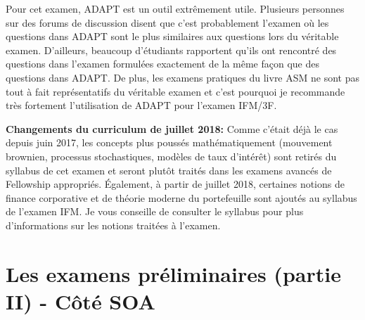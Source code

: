 Pour cet examen, ADAPT est un outil extrêmement utile. Plusieurs personnes sur des forums de discussion disent que c'est probablement l'examen où les questions dans ADAPT sont le plus similaires aux questions lors du véritable examen. D'ailleurs, beaucoup d'étudiants rapportent qu'ils ont rencontré des questions dans l'examen formulées exactement de la même façon que des questions dans ADAPT. De plus, les examens pratiques du livre ASM ne sont pas tout à fait représentatifs du véritable examen et c'est pourquoi je recommande très fortement l'utilisation de ADAPT pour l'examen IFM/3F.\vspace{\baselineskip}

\textbf{Changements du curriculum de juillet 2018:} Comme c'était déjà le cas depuis juin 2017, les concepts plus poussés mathématiquement (mouvement brownien, processus stochastiques, modèles de taux d'intérêt) sont retirés du syllabus de cet examen et seront plutôt traités dans les examens avancés de Fellowship appropriés. Également, à partir de juillet 2018, certaines notions de finance corporative et de théorie moderne du portefeuille sont ajoutés au syllabus de l'examen IFM. Je vous conseille de consulter le syllabus pour plus d'informations sur les notions traitées à l'examen.


\newpage




\section*{Les examens préliminaires (partie II) - Côté SOA}
\label{sec:prelimssuitesoa}

